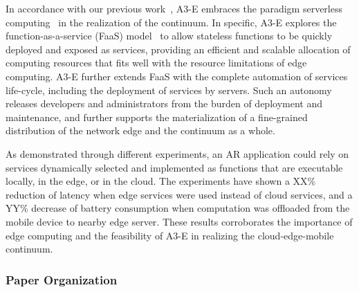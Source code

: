 
In accordance with our previous work~\cite{GarrigaMendonca2017}, A3-E embraces the paradigm serverless computing~\cite{Hendrickson:2016,baldini2017serverless} in the realization of the continuum. In specific, A3-E explores the function-as-a-service (FaaS) model~\cite{MateosFaaster17} to allow stateless functions to be quickly deployed and exposed as services, providing an efficient and scalable allocation of computing resources that fits well with the resource limitations of edge computing. A3-E further extends FaaS with the complete automation of services life-cycle, including the deployment of services by servers. Such an autonomy releases developers and administrators from the burden of deployment and maintenance, and further supports the materialization of a fine-grained distribution of the network edge and the continuum as a whole.


As demonstrated through different experiments, an AR application could rely on services dynamically selected and implemented as functions that are executable locally, in the edge, or in the cloud. The experiments have shown a XX\% reduction of latency when edge services were used instead of cloud services, and a YY\% decrease of battery consumption when computation was offloaded from the mobile device to nearby edge server. These results corroborates the importance of edge computing and the feasibility of A3-E in realizing the cloud-edge-mobile continuum.




\subsubsection*{Paper Organization}

